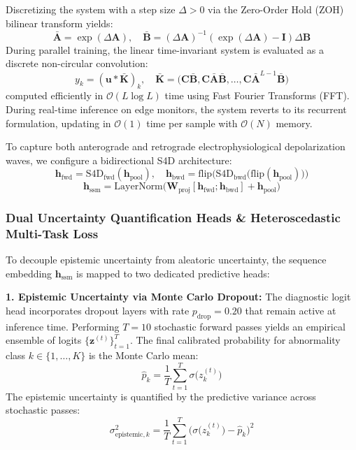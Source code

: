 \documentclass[journal]{IEEEtran}
\begin{document}
Discretizing the system with a step size $\Delta > 0$ via the Zero-Order Hold (ZOH) bilinear transform yields:
\begin{equation}
    \bar{\mathbf{A}} = \exp(\Delta \mathbf{A}), \quad \bar{\mathbf{B}} = (\Delta \mathbf{A})^{-1}(\exp(\Delta \mathbf{A}) - \mathbf{I})\Delta \mathbf{B}
\end{equation}
During parallel training, the linear time-invariant system is evaluated as a discrete non-circular convolution:
\begin{equation}
    y_k = (\mathbf{u} * \bar{\mathbf{K}})_k, \quad \bar{\mathbf{K}} = \big(\mathbf{C}\bar{\mathbf{B}}, \mathbf{C}\bar{\mathbf{A}}\bar{\mathbf{B}}, \dots, \mathbf{C}\bar{\mathbf{A}}^{L-1}\bar{\mathbf{B}}\big)
\end{equation}
computed efficiently in $\mathcal{O}(L \log L)$ time using Fast Fourier Transforms (FFT). During real-time inference on edge monitors, the system reverts to its recurrent formulation, updating in $\mathcal{O}(1)$ time per sample with $\mathcal{O}(N)$ memory.

To capture both anterograde and retrograde electrophysiological depolarization waves, we configure a bidirectional S4D architecture:
\begin{equation}
    \mathbf{h}_{\text{fwd}} = \text{S4D}_{\text{fwd}}(\mathbf{h}_{\text{pool}}), \quad \mathbf{h}_{\text{bwd}} = \text{flip}\Big(\text{S4D}_{\text{bwd}}\big(\text{flip}(\mathbf{h}_{\text{pool}})\big)\Big)
\end{equation}
\begin{equation}
    \mathbf{h}_{\text{ssm}} = \text{LayerNorm}\Big(\mathbf{W}_{\text{proj}}[\mathbf{h}_{\text{fwd}}; \mathbf{h}_{\text{bwd}}] + \mathbf{h}_{\text{pool}}\Big)
\end{equation}

\subsubsection{Dual Uncertainty Quantification Heads \& Heteroscedastic Multi-Task Loss}
To decouple epistemic uncertainty from aleatoric uncertainty, the sequence embedding $\mathbf{h}_{\text{ssm}}$ is mapped to two dedicated predictive heads:

\textbf{1. Epistemic Uncertainty via Monte Carlo Dropout:}
The diagnostic logit head incorporates dropout layers with rate $p_{\text{drop}} = 0.20$ that remain active at inference time. Performing $T=10$ stochastic forward passes yields an empirical ensemble of logits $\{\mathbf{z}^{(t)}\}_{t=1}^T$. The final calibrated probability for abnormality class $k \in \{1, \dots, K\}$ is the Monte Carlo mean:
\begin{equation}
    \hat{p}_k = \frac{1}{T} \sum_{t=1}^T \sigma\big(z_k^{(t)}\big)
\end{equation}
The epistemic uncertainty is quantified by the predictive variance across stochastic passes:
\begin{equation}
    \sigma_{\text{epistemic}, k}^2 = \frac{1}{T} \sum_{t=1}^T \Big(\sigma\big(z_k^{(t)}\big) - \hat{p}_k\Big)^2
\end{equation}
\end{document}
